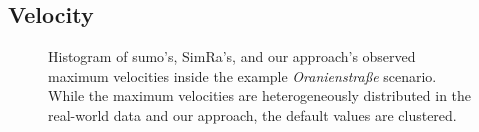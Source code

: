 \subsection{Velocity}
\label{subsec:velocity_evaluation}
\begin{figure}
    \centering
    \hfill
    \caption{%
        Histogram of \ac{sumo}'s, SimRa's, and our approach's observed maximum velocities inside the example \textit{Oranienstraße} scenario.
        While the maximum velocities are heterogeneously distributed in the real-world data and our approach, the default values are clustered.
    }%
    \label{fig:eval_velo}
\end{figure}

